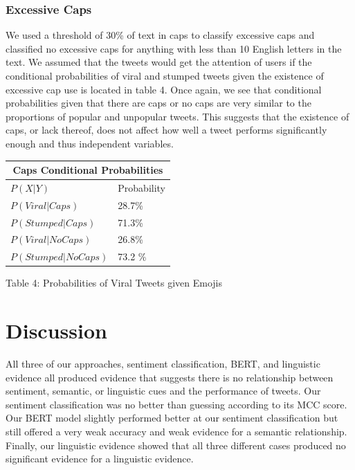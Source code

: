 \documentclass{article}
\begin{document}
\subsubsection{Excessive Caps}

We used a threshold of 30\% of text in caps to classify excessive caps and classified no excessive caps for anything with less than 10 English letters in the text. 
We assumed that the tweets would get the attention of users if the conditional probabilities of viral and stumped tweets given the existence of excessive cap use is located in table 4. 
Once again, we see that conditional probabilities given that there are caps or no caps are very similar to the proportions of popular and unpopular tweets.
This suggests that the existence of caps, or lack thereof, does not affect how well a tweet performs significantly enough and thus independent variables. \\

{
\begin{tabular}{ |p{3.5 cm}|p{3.5cm}|  }
\hline
\multicolumn{2}{|c|}{Caps Conditional Probabilities} \\
\hline
$P(X | Y)$ & Probability \\
\hline
$P(Viral | Caps)$  & 28.7\% \\
$P(Stumped | Caps)$ & 71.3\% \\
$P(Viral | No Caps)$ & 26.8\% \\
$P(Stumped | No Caps)$ & 73.2 \%  \\
\hline
\end{tabular}
\centerline{ }

\centerline{Table 4: Probabilities of Viral Tweets given Emojis}
}

\section{Discussion}
\label{sec:discussion}

All three of our approaches, sentiment classification, BERT, and linguistic evidence all produced evidence that suggests there is no relationship between sentiment, semantic, or linguistic cues and the performance of tweets.
Our sentiment classification was no better than guessing according to its MCC score. 
Our BERT model slightly performed better at our sentiment classification but still offered a very weak accuracy and weak evidence for a semantic relationship. 
Finally, our linguistic evidence showed that all three different cases produced no significant evidence for a linguistic evidence.
\end{document}
